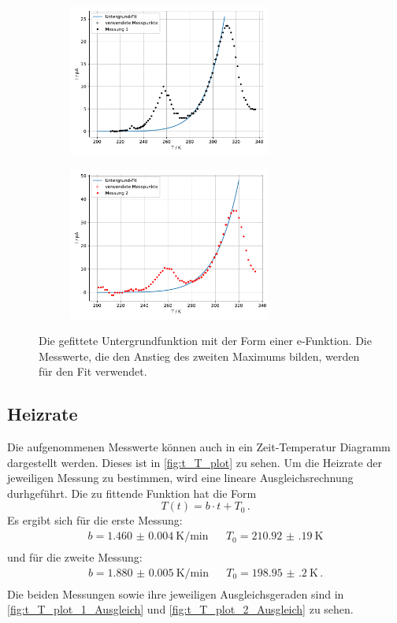   \begin{figure}[H]
    \begin{subfigure}[b]{.5\linewidth}
      \centering
      \includegraphics[height=5cm, keepaspectratio]{build/untergrund_1.pdf}
    \end{subfigure}
    \begin{subfigure}[b]{.5\linewidth}
      \centering
      \includegraphics[height=5cm, keepaspectratio]{build/untergrund_2.pdf}
    \end{subfigure}
    
    \caption{Die gefittete Untergrundfunktion mit der Form einer e-Funktion.
      Die Messwerte, die den Anstieg des zweiten Maximums bilden, werden für den Fit verwendet.}
    \label{fig:T_I_plot_Untergrund}
  \end{figure} %

\subsection{Heizrate}
  Die aufgenommenen Messwerte können auch in ein Zeit-Temperatur Diagramm dargestellt werden.
  Dieses ist in \autoref{fig:t_T_plot} zu sehen.
  Um die Heizrate der jeweiligen Messung zu bestimmen, wird eine lineare Ausgleichsrechnung durhgeführt.
  Die zu fittende Funktion hat die Form
  \begin{equation*}
    T(t) = b \cdot t + T_0 \, .
  \end{equation*}
  Es ergibt sich für die erste Messung:
  \begin{align*}
    b = \SI{1.460(4)}{\kelvin\per\minute} &&  T_0 = \SI{210.92(19)}{\kelvin}\\
  \end{align*}
  und für die zweite Messung:
  \begin{align*}
    b =  \SI{1.880(5)}{\kelvin\per\minute}  &&  T_0 = \SI{198.95(20)}{\kelvin} \, . \\
  \end{align*}
  Die beiden Messungen sowie ihre jeweiligen Ausgleichsgeraden sind in \autoref{fig:t_T_plot_1_Ausgleich} und \autoref{fig:t_T_plot_2_Ausgleich} zu sehen.

